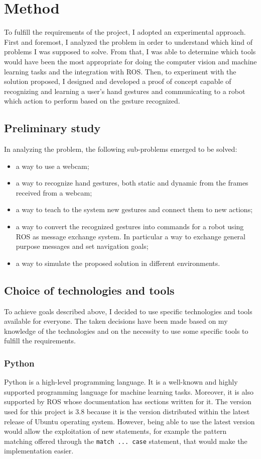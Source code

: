 \documentclass[../thesis.tex]{subfiles}
\begin{document}
\chapter{Method}\label{cap:methods}
To fulfill the requirements of the project, I adopted an experimental approach. First and foremost, I analyzed the problem in order to understand which kind of problems I was supposed to solve. From that, I was able to determine which tools would have been the most appropriate for doing the computer vision and machine learning tasks and the integration with \gls{ROS}. Then, to experiment with the solution proposed, I designed and developed a proof of concept capable of recognizing and learning a user’s hand gestures and communicating to a robot which action to perform based on the gesture recognized.\\

\section{Preliminary study}
In analyzing the problem, the following sub-problems emerged to be solved:
\begin{itemize}
    \item a way to use a webcam;
    \item a way to recognize hand gestures, both static and dynamic from the frames received from a webcam;
    \item a way to teach to the system new gestures and connect them to new actions;
    \item a way to convert the recognized gestures into commands for a robot using \gls{ROS} as message exchange system. In particular a way to exchange general purpose messages and set navigation goals;
    \item a way to simulate the proposed solution in different environments.
\end{itemize}

\section{Choice of technologies and tools}\label{sec:technologies_and_tolls}
To achieve goals described above, I decided to use specific technologies and tools available for everyone. The taken decisions have been made based on my knowledge of the technologies and on the necessity to use some specific tools to fulfill the requirements.
\subsection{Python}
Python is a high-level programming language. It is a well-known and highly supported programming language for machine learning tasks. Moreover, it is also supported by \acrshort{ROS} whose documentation has sections written for it. The version used for this project is 3.8 because it is the version distributed within the latest release of Ubuntu operating system. However, being able to use the latest version would allow the exploitation of new statements, for example the pattern matching offered through the \texttt{match ... case} statement, that would make the implementation easier.
\end{document}
